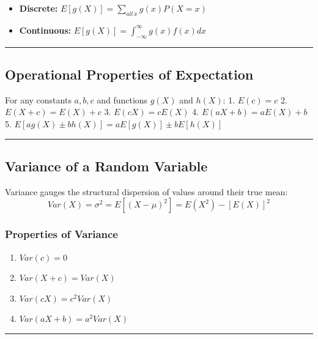 \documentclass[
]{article}
\providecommand{\tightlist}{%
  \setlength{\itemsep}{0pt}\setlength{\parskip}{0pt}}
\begin{document}
\begin{itemize}
\tightlist
\item
  \textbf{Discrete:} \(E[g(X)] = \sum_{all\,x} g(x) P(X=x)\)
\item
  \textbf{Continuous:}
  \(E[g(X)] = \int_{-\infty}^{\infty} g(x) f(x) dx\)
\end{itemize}

\begin{center}\rule{0.5\linewidth}{0.5pt}\end{center}

\subsection{Operational Properties of
Expectation}\label{operational-properties-of-expectation}

For any constants \(a, b, c\) and functions \(g(X)\) and \(h(X)\): 1.
\(E(c) = c\) 2. \(E(X + c) = E(X) + c\) 3. \(E(cX) = cE(X)\) 4.
\(E(aX + b) = aE(X) + b\) 5.
\(E[ag(X) \pm bh(X)] = aE[g(X)] \pm bE[h(X)]\)

\begin{center}\rule{0.5\linewidth}{0.5pt}\end{center}

\subsection{Variance of a Random
Variable}\label{variance-of-a-random-variable}

Variance gauges the structural dispersion of values around their true
mean: \[Var(X) = \sigma^2 = E[(X - \mu)^2] = E(X^2) - [E(X)]^2\]

\subsubsection{Properties of Variance}\label{properties-of-variance}

\begin{enumerate}
\def\labelenumi{\arabic{enumi}.}
\tightlist
\item
  \(Var(c) = 0\)
\item
  \(Var(X + c) = Var(X)\)
\item
  \(Var(cX) = c^2 Var(X)\)
\item
  \(Var(aX + b) = a^2 Var(X)\)
\end{enumerate}

\begin{center}\rule{0.5\linewidth}{0.5pt}\end{center}
\end{document}
